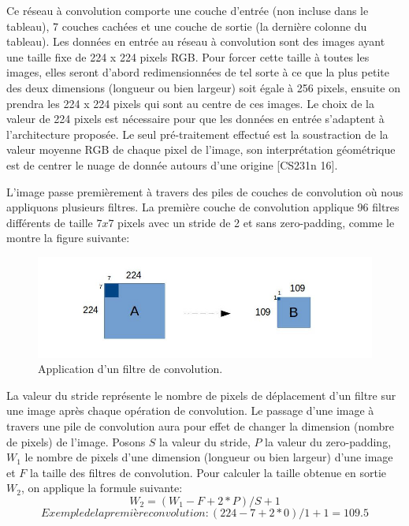 	Ce réseau à convolution comporte une couche d'entrée (non incluse dans le tableau), 7 couches cachées et une couche de sortie (la dernière colonne du tableau). Les données en entrée au réseau à convolution sont des images ayant une taille fixe de 224 x 224 pixels RGB. Pour forcer cette taille à toutes les images, elles seront d'abord redimensionnées de tel sorte à ce que la plus petite des deux dimensions (longueur ou bien largeur) soit égale à 256 pixels, ensuite on prendra les 224 x 224 pixels qui sont au centre de ces images. Le choix de la valeur de 224 pixels est nécessaire pour que les données en entrée s'adaptent à l'architecture proposée. Le seul pré-traitement effectué est la soustraction de la valeur moyenne RGB de chaque pixel de l'image, son interprétation géométrique est de centrer le nuage de donnée autours d'une origine [CS231n 16].

	L'image passe premièrement à travers des piles de couches de convolution où nous appliquons plusieurs filtres. La première couche de convolution applique 96 filtres différents de taille $7x7$ pixels avec un stride de 2 et sans zero-padding, comme le montre la figure suivante:

\begin{figure}[H]
	\centering
		\includegraphics[width=7.5in]{Figures/conv.jpg}
	\caption[An Electron]{Application d'un filtre de convolution.}
	\label{fig:Electron}
\end{figure}

	La valeur du stride représente le nombre de pixels de déplacement d'un filtre sur une image après chaque opération de convolution. Le passage d'une image à travers une pile de convolution aura pour effet de changer la dimension (nombre de pixels) de l'image. Posons $S$ la valeur du stride, $P$ la valeur du zero-padding, $W_{1}$ le nombre de pixels d'une dimension (longueur ou bien largeur) d'une image et $F$ la taille des filtres de convolution. Pour calculer la taille obtenue en sortie $W_{2}$, on applique la formule suivante:
$$W_{2} = (W_{1} - F + 2*P)/S + 1$$
$$Exemple de la première convolution: (224 - 7 + 2*0)/1 +1 = 109.5$$
	

